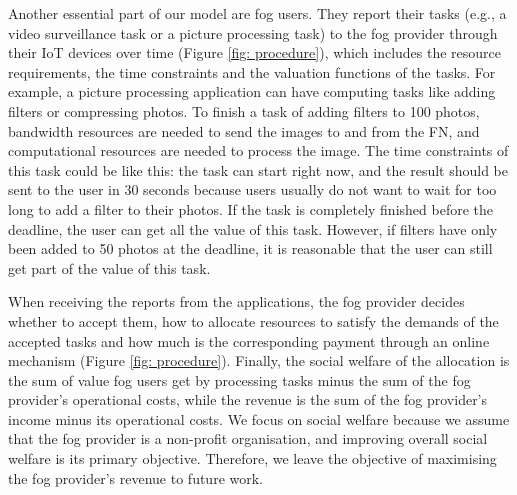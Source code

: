 \documentclass[11pt]{phdthesis}
\begin{document}
Another essential part of our model are fog users. They report their tasks (e.g., a video surveillance task or a picture processing task) to the fog provider through their IoT devices over time (Figure \ref{fig: procedure}), which includes the resource requirements, the time constraints and the valuation functions of the tasks. For example, a picture processing application can have computing tasks like adding filters or compressing photos. To finish a task of adding filters to 100 photos, bandwidth resources are needed to send the images to and from the FN, and computational resources are needed to process the image. The time constraints of this task could be like this: the task can start right now, and the result should be sent to the user in 30 seconds because users usually do not want to wait for too long to add a filter to their photos. If the task is completely finished before the deadline, the user can get all the value of this task. However, if filters have only been added to 50 photos at the deadline, it is reasonable that the user can still get part of the value of this task. 

When receiving the reports from the applications, the fog provider decides whether to accept them, how to allocate resources to satisfy the demands of the accepted tasks and how much is the corresponding payment through an online mechanism (Figure \ref{fig: procedure}). Finally, the social welfare of the allocation is the sum of value fog users get by processing tasks minus the sum of the fog provider's operational costs, while the revenue is the sum of the fog provider's income minus its operational costs. We focus on social welfare because we assume that the fog provider is a non-profit organisation, and improving overall social welfare is its primary objective. Therefore, we leave the objective of maximising the fog provider’s revenue to future work.
\end{document}

